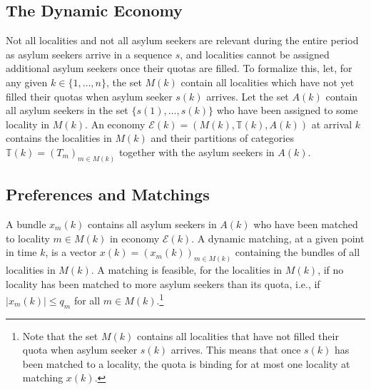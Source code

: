 \documentclass[12pt,fleqn]{article}
\begin{document}
\subsection{The Dynamic Economy}
Not all localities and not all asylum seekers are relevant during the entire period as asylum seekers arrive in a sequence $s$, and localities cannot be assigned additional asylum seekers once their quotas are filled. To formalize this, let, for any given $k\in \{1,\ldots,n\}$, the set $M(k)$ contain all localities which have not yet filled their quotas when asylum seeker $s(k)$ arrives. Let the set $A(k)$ contain all asylum seekers in the set $\{s(1),\ldots,s(k)\}$ who have been assigned to some locality in $M(k)$. An economy $\mathcal{E}(k)=(M(k),\mathbb{T}(k),A(k))$ at arrival $k$ contains the localities in $M(k)$ and their partitions of categories $\mathbb{T}(k)=(T_m)_{m\in M(k)}$ together with the asylum seekers in $A(k)$.

\subsection{Preferences and Matchings}
A bundle $x_m(k)$ contains all asylum seekers in $A(k)$ who have been matched to locality $m\in M(k)$ in economy $\mathcal{E}(k)$. A dynamic matching, at a given point in time $k$, is a vector $x(k)=(x_m(k))_{m\in M(k)}$ containing the bundles of all localities in $M(k)$. A matching is feasible, for the localities in $M(k)$, if no locality has been matched to more asylum seekers than its quota, i.e., if $|x_m(k)|\leq q_m$ for all $m\in M(k)$.\footnote{Note that the set $M(k)$ contains all localities that have not filled their quota when asylum seeker $s(k)$ arrives. This means that once $s(k)$ has been matched to a locality, the quota is binding for at most one locality at matching $x(k)$.}
\end{document}
